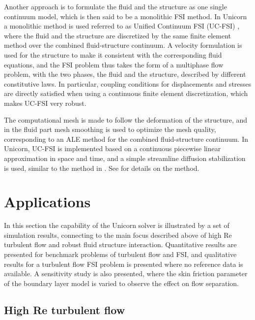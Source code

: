 Another approach is to formulate the fluid and the structure as one single continuum model, which is then said to be a monolithic FSI method. In Unicorn a monolithic method is used referred to as Unified Continuum FSI (UC-FSI) \cite{HoffmanJanssonStockli2011}, where the fluid and the structure are discretized by the same finite element method over the combined fluid-structure continuum. A velocity formulation is used for the structure to make it consistent with the corresponding fluid equations, and the FSI problem thus takes the form of a multiphase flow problem, with the two phases, the fluid and the structure, described by different constitutive laws. In particular, coupling conditions for displacements and stresses are directly satisfied when using a continuous finite element discretization, which makes UC-FSI very robust.

The computational mesh is made to follow the deformation of the structure, and in the fluid part mesh smoothing is used to optimize the mesh quality, corresponding to an ALE method for the combined fluid-structure continuum.
In Unicorn, UC-FSI is implemented based on a continuous piecewise linear approximation in space and time, and a simple streamline diffusion stabilization is used, similar to the method in \cite{Hansbo2000}.
See \cite{HoffmanJanssonStockli2011} for details on the method.


\section{Applications}

In this section the capability of the Unicorn solver is illustrated by a set of simulation results, connecting to the main focus described above of high Re turbulent flow and robust fluid structure interaction. Quantitative results are presented for benchmark problems of turbulent flow and FSI, and qualitative results for a turbulent flow FSI problem is presented where no reference data is available. A sensitivity study is also presented, where the skin friction parameter of the boundary layer model is varied to observe the effect on flow separation.

\subsection{High Re turbulent flow}

